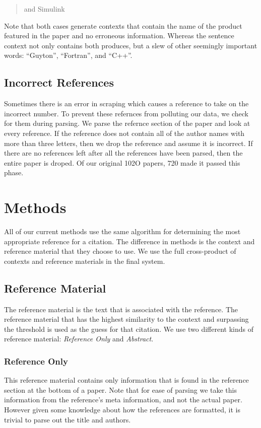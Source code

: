 \documentclass[10pt, conference, compsocconf]{IEEEtran}
\begin{document}
\begin{quote}
and Simulink
\end{quote}

Note that both cases generate contexts that contain the name of the product featured in the paper and no erroneous information. Whereas the
sentence context not only contains both produces, but a slew of other seemingly important words: ``Guyton'', ``Fortran'', and ``C++''.

\subsection{Incorrect References}
Sometimes there is an error in scraping which causes a reference to take on the incorrect number.
To prevent these refernces from polluting our data, we check for them during parsing.
We parse the refernce section of the paper and look at every reference. If the reference does not contain all of the author names with
more than three letters, then we drop the reference and assume it is incorrect.
If there are no references left after all the references have been parsed, then the entire paper is droped.
Of our original 102O papers, 720 made it passed this phase.

\section{Methods}\label{sec:methods}
All of our current methods use the same algorithm for determining the most appropriate reference for a citation.
The difference in methods is the context and reference material that they choose to use.
We use the full cross-product of contexts and reference materials in the final system.

\subsection{Reference Material}
The reference material is the text that is associated with the reference.
The reference material that has the highest similarity to the context and surpassing the threshold is
used as the guess for that citation.
We use two different kinds of reference material: \textit{Reference Only} and \textit{Abstract}.

\subsubsection{Reference Only}
This reference material contains only information that is found in the reference section at the bottom of a paper.
Note that for ease of parsing we take this information from the reference's meta information, and not the actual paper. However given
some knowledge about how the references are formatted, it is trivial to parse out the title and authors.
\end{document}
